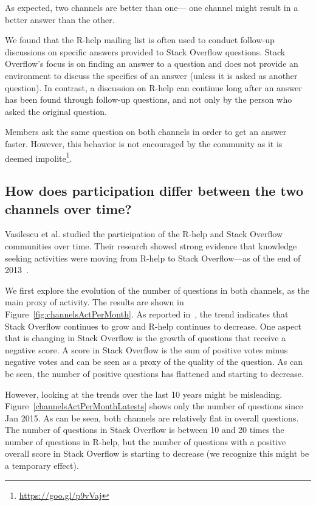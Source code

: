 \documentclass[smallextended]{svjour3}       %
\newcommand{\SO}{Stack Overflow\xspace}
\newcommand{\RH}{R-help\xspace}
\newcommand{\rqd}{How does participation differ between the two channels over time?}
\begin{document}
\begin{description}[itemsep=2pt, topsep=0pt, leftmargin=1em, parsep=0pt]
\item[Find a better answer:] As expected, two channels are better than one---
  one channel might result in a better answer than the other.
\item[Support follow-up questions:] We found that the \RH mailing list is often used to conduct follow-up discussions on
  specific answers provided to \SO questions. \SO's focus is on finding an answer to a question and does not
  provide an environment to discuss the specifics of an answer (unless it is asked as another question).
In contrast, a discussion on \RH can continue long after an answer has been found through follow-up questions, and not only by the person who asked the original question.  
\item[Speed up answers:] Members ask the same question on both channels in order to get an answer faster. However, this behavior is not encouraged by the community as it is deemed impolite\footnote{\href{https://goo.gl/p9vVaj}{https://goo.gl/p9vVaj}}.
\end{description}


\subsection{\rqd}

Vasilescu et al. studied the participation of the \RH and \SO communities over time. Their
research showed strong evidence that knowledge seeking activities were moving from \RH to \SO---as of the end of
2013~\cite{Vasilescu2014c}.

We first explore the evolution of the number of questions in both channels, as the main proxy of activity. The results
are shown in Figure~\ref{fig:channelsActPerMonth}. As reported in~\cite{Vasilescu2014c}, the trend indicates that \SO
continues to grow and \RH continues to decrease. One aspect that is changing in \SO is the growth of questions that
receive a negative score. A score in \SO is the sum of positive votes minus negative votes and can be seen as a proxy of
the quality of the question. As can be seen, the number of positive questions has flattened and starting to decrease.

However, looking at the trends over the last 10 years might be misleading. Figure~\ref{channelsActPerMonthLatests} shows only the
number of questions since Jan 2015. As can be seen, both channels are relatively flat in overall questions. The
number of questions in \SO is between 10 and 20 times the number of questions in \RH, but the number of questions with
a positive overall score in \SO is starting to decrease (we recognize this might be a temporary effect).
\end{document}
